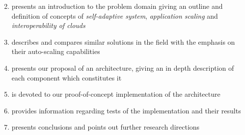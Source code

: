 \begin{enumerate}
    \setcounter{enumi}{1}
  \item presents an introduction to the problem domain giving an outline and definition of concepts of \emph{self-adaptive system}, \emph{application scaling} and \emph{interoperability of clouds}
  \item describes and compares similar solutions in the field with the emphasis on their auto-scaling capabilities
  \item presents our proposal of an architecture, giving an in depth description of each component which constitutes it
  \item is devoted to our proof-of-concept implementation of the architecture
  \item provides information regarding tests of the implementation and their results
  \item presents conclusions and points out further research directions
\end{enumerate}

